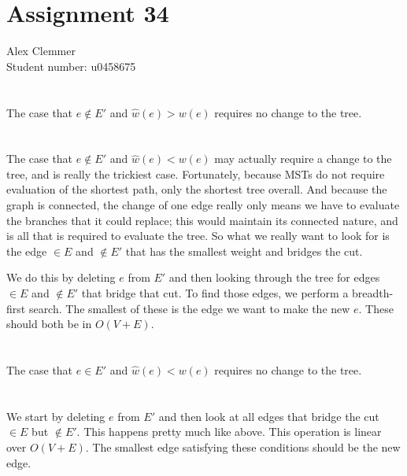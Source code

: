 \documentclass[a4paper]{article}
\begin{document}
\section*{Assignment 34}
Alex Clemmer\\
Student number: u0458675

\section{}

The case that $e \not \in E'$ and $\hat w(e) > w(e)$ requires no change to the tree.

\section{}

The case that $e \not \in E'$ and $\hat w(e) < w(e)$ may actually require a change to the tree, and is really the trickiest case. Fortunately, because MSTs do not require evaluation of the shortest path, only the shortest tree overall. And because the graph is connected, the change of one edge really only means we have to evaluate the branches that it could replace; this would maintain its connected nature, and is all that is required to evaluate the tree. So what we really want to look for is the edge $\in E$ and $\not \in E'$ that has the smallest weight and bridges the cut.

We do this by deleting $e$ from $E'$ and then looking through the tree for edges $\in E$ and $\not \in E'$ that bridge that cut. To find those edges, we perform a breadth-first search. The smallest of these is the edge we want to make the new $e$. These should both be in $O(V+E)$.

\section{}

The case that $e \in E'$ and $\hat w(e) < w(e)$ requires no change to the tree.

\section{}

We start by deleting $e$ from $E'$ and then look at all edges that bridge the cut $\in E$ but $\not \in E'$. This happens pretty much like above. This operation is linear over $O(V+E)$. The smallest edge satisfying these conditions should be the new edge.
\end{document}
